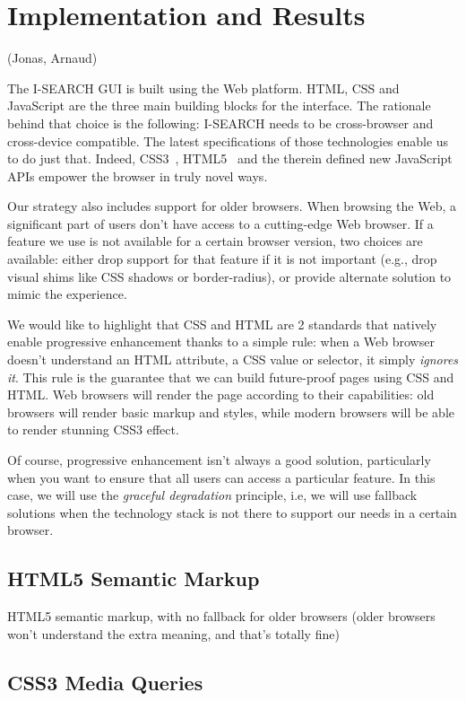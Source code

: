 \documentclass[runningheads,a4paper]{llncs} \usepackage[utf8]{inputenc}
\begin{document}
\section{Implementation and Results}
(Jonas, Arnaud)

The \mbox{I-SEARCH} GUI is built using the Web platform. HTML, CSS and JavaScript are the three main building blocks for the interface. The rationale behind that choice is the following: \mbox{I-SEARCH} needs to be cross-browser and cross-device compatible. The latest specifications of those technologies enable us to do just that. Indeed, CSS3~\cite{css3}, HTML5~\cite{html5} and the therein defined new JavaScript APIs empower the browser in truly novel ways.

Our strategy also includes support for older browsers. When browsing the Web, a significant part of users don't have access to a cutting-edge Web browser. If a feature we use is not available for a certain browser version, two choices are available: either drop support for that feature if it is not important (e.g., drop visual shims like CSS shadows or border-radius), or provide alternate solution to mimic the experience. 

We would like to highlight that CSS and HTML are 2 standards that natively enable progressive enhancement thanks to a simple rule: when a Web browser doesn't understand an HTML attribute, a CSS value or selector, it simply \emph{ignores it}. This rule is the guarantee that we can build future-proof pages using CSS and HTML. Web browsers will render the page according to their capabilities: old browsers will render basic markup and styles, while modern browsers will be able to render stunning CSS3 effect.

Of course, progressive enhancement isn't always a good solution, particularly when you want to ensure that all users can access a particular feature. In this case, we will use the \emph{graceful degradation} principle, i.e, we will use fallback solutions when the technology stack is not there to support our needs in a certain browser. 

\subsection{HTML5 Semantic Markup} 

HTML5 semantic markup, with no fallback for older browsers (older browsers won't understand the extra meaning, and that's totally fine)

\subsection{CSS3 Media Queries} 
\end{document}
